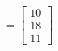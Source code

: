 \documentclass[preview]{standalone}
\begin{document}
\begin{align*}
=\begin{bmatrix} 10 \\ 18 \\ 11 \end{bmatrix}
\end{align*}
\end{document}
